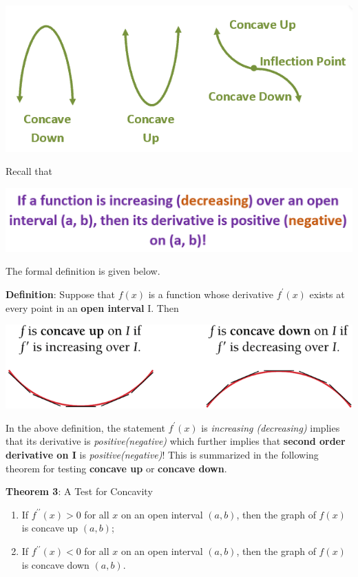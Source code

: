 \documentclass[
]{book}
\begin{document}
\begin{center}\includegraphics[width=0.7\linewidth]{img08/w08-concavity} \end{center}

Recall that

\begin{center}\includegraphics[width=0.7\linewidth]{img08/w08-incresingFunPosDerivative} \end{center}

The formal definition is given below.

\textbf{Definition}: Suppose that \(f(x)\) is a function whose derivative \(f^\prime(x)\) exists at every point in an \textbf{open interval} I. Then

\begin{center}\includegraphics[width=0.5\linewidth]{img08/w08-concavityDef} \end{center}

In the above definition, the statement \textbf{\(f^\prime(x)\)} is \emph{increasing (decreasing)} implies that its derivative is \emph{positive(negative)} which further implies that \textbf{second order derivative on I} is \emph{positive(negative)}! This is summarized in the following theorem for testing \textbf{concave up} or \textbf{concave down}.

\hfill\break

\textbf{Theorem 3}: A Test for Concavity

\begin{enumerate}
\def\labelenumi{\arabic{enumi}.}
\item
  If \(f^{\prime\prime}(x) > 0\) for all \(x\) on an open interval \((a, b)\), then the graph of \(f(x)\) is concave up \((a, b)\);
\item
  If \(f^{\prime\prime}(x) < 0\) for all \(x\) on an open interval \((a, b)\), then the graph of \(f(x)\) is concave down \((a, b)\).
\end{enumerate}
\end{document}
